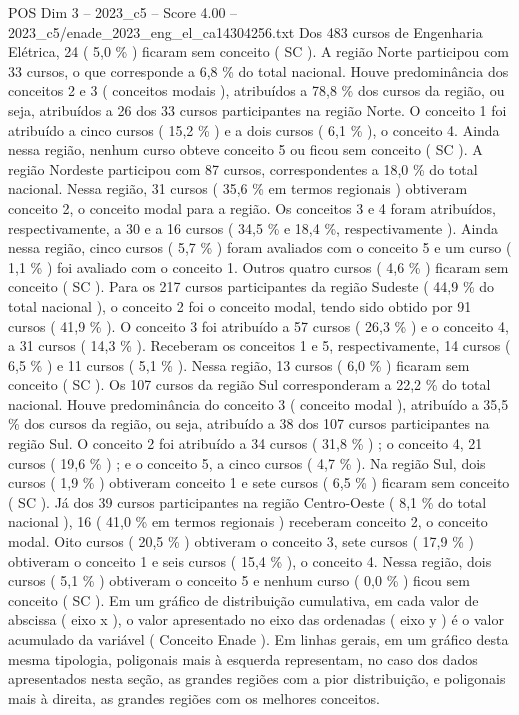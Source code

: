 \begin{textsample}{POS Dim 3 – 2023\_c5 – Score 4.00 – 2023\_c5/enade\_2023\_eng\_el\_ca14304256.txt}
Dos 483 cursos de Engenharia Elétrica, 24 ( 5,0 \% ) ficaram sem conceito ( SC ).
A região Norte participou com 33 cursos, o que corresponde a 6,8 \% do total nacional.
Houve predominância dos conceitos 2 e 3 ( conceitos modais ), atribuídos a 78,8 \% dos cursos da região, ou seja, atribuídos a 26 dos 33 cursos participantes na região Norte.
O conceito 1 foi atribuído a cinco cursos ( 15,2 \% ) e a dois cursos ( 6,1 \% ), o conceito 4.
Ainda nessa região, nenhum curso obteve conceito 5 ou ficou sem conceito ( SC ).
A região Nordeste participou com 87 cursos, correspondentes a 18,0 \% do total nacional.
Nessa região, 31 cursos ( 35,6 \% em termos regionais ) obtiveram conceito 2, o conceito modal para a região.
Os conceitos 3 e 4 foram atribuídos, respectivamente, a 30 e a 16 cursos ( 34,5 \% e 18,4 \%, respectivamente ).
Ainda nessa região, cinco cursos ( 5,7 \% ) foram avaliados com o conceito 5 e um curso ( 1,1 \% ) foi avaliado com o conceito 1.
Outros quatro cursos ( 4,6 \% ) ficaram sem conceito ( SC ).
Para os 217 cursos participantes da região Sudeste ( 44,9 \% do total nacional ), o conceito 2 foi o conceito modal, tendo sido obtido por 91 cursos ( 41,9 \% ).
O conceito 3 foi atribuído a 57 cursos ( 26,3 \% ) e o conceito 4, a 31 cursos ( 14,3 \% ).
Receberam os conceitos 1 e 5, respectivamente, 14 cursos ( 6,5 \% ) e 11 cursos ( 5,1 \% ).
Nessa região, 13 cursos ( 6,0 \% ) ficaram sem conceito ( SC ).
Os 107 cursos da região Sul corresponderam a 22,2 \% do total nacional.
Houve predominância do conceito 3 ( conceito modal ), atribuído a 35,5 \% dos cursos da região, ou seja, atribuído a 38 dos 107 cursos participantes na região Sul.
O conceito 2 foi atribuído a 34 cursos ( 31,8 \% ) ; o conceito 4, 21 cursos ( 19,6 \% ) ; e o conceito 5, a cinco cursos ( 4,7 \% ).
Na região Sul, dois cursos ( 1,9 \% ) obtiveram conceito 1 e sete cursos ( 6,5 \% ) ficaram sem conceito ( SC ).
Já dos 39 cursos participantes na região Centro-Oeste ( 8,1 \% do total nacional ), 16 ( 41,0 \% em termos regionais ) receberam conceito 2, o conceito modal.
Oito cursos ( 20,5 \% ) obtiveram o conceito 3, sete cursos ( 17,9 \% ) obtiveram o conceito 1 e seis cursos ( 15,4 \% ), o conceito 4.
Nessa região, dois cursos ( 5,1 \% ) obtiveram o conceito 5 e nenhum curso ( 0,0 \% ) ficou sem conceito ( SC ).
Em um gráfico de distribuição cumulativa, em cada valor de abscissa ( eixo x ), o valor apresentado no eixo das ordenadas ( eixo y ) é o valor acumulado da variável ( Conceito Enade ).
Em linhas gerais, em um gráfico desta mesma tipologia, poligonais mais à esquerda representam, no caso dos dados apresentados nesta seção, as grandes regiões com a pior distribuição, e poligonais mais à direita, as grandes regiões com os melhores conceitos.

\end{textsample}
